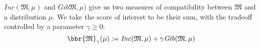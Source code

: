 \documentclass{article}
\theoremstyle{plain}
\theoremstyle{definition}
\theoremstyle{remark}
\newcommand{\thickD}{I\mkern-8muD}
\newcommand{\kldiv}{\thickD\infdivx}%
\let\H\relax
\DeclareMathOperator{\H}{\mathrm{H}} %
\DeclareMathOperator*{\E}{\mathbb{E}} %
\newcommand\mat[1]{\mathbf{#1}}
\newcommand\numberthis{\addtocounter{equation}{1}\tag{\theequation}}
\def\sheq{\!=\!}
\newcommand{\bp}[1][L]{\mat{p}_{\!_{#1}\!}}
\newcommand{\Ed}{\mathcal E}
\newcommand{\dg}[1]{\mathfrak{#1}}
\newcommand\Gib{\mathit{Gib}}
\newcommand\extrainfo[2][\dg M]{\Gib(#1,#2)}
\newcommand\Inc{\mathit{Inc}}
\numberwithin{equation}{section}
\begin{document}
$\Inc({\dg M}, \mu)$ and $\Gib{\dg M},\mu)$ give us two measures
of compatibility between ${\dg M}$ and a distribution $\mu$.
We take the score of interest to be their sum, with the tradeoff
        controlled by a parameter $\gamma \ge 0$:
        \begin{equation}
	  \bbr{\dg M}_\gamma(\mu)
	 := \Inc(\dg M,\mu) + \gamma \extrainfo\mu
                \label{eqn:full-score}
    	\end{equation}
\end{document}
